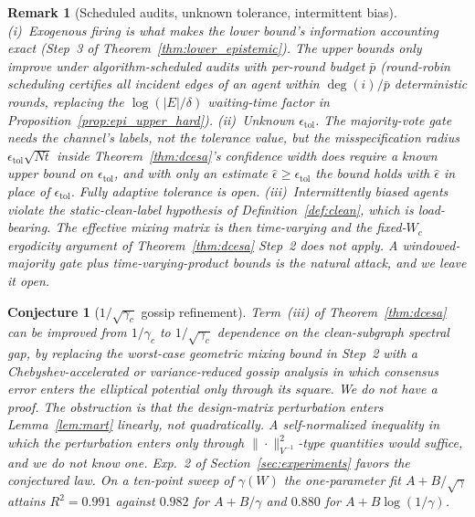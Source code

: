 \documentclass[11pt]{article}
\newtheorem{conjecture}[theorem]{Conjecture}
\newtheorem{remark}[theorem]{Remark}
\begin{document}
\begin{remark}[Scheduled audits, unknown tolerance, intermittent bias]
\label{rem:model_scope}
(i)~Exogenous firing is what makes the \emph{lower} bound's
information accounting exact (Step~3 of
Theorem~\ref{thm:lower_epistemic}). The \emph{upper} bounds only
improve under algorithm-scheduled audits with per-round budget
$\bar p$ (round-robin scheduling certifies all incident edges of an
agent within $\deg(i)/\bar p$ deterministic rounds, replacing the
$\log(|E|/\delta)$ waiting-time factor in
Proposition~\ref{prop:epi_upper_hard}).  (ii)~Unknown
$\epsilon_{\mathrm{tol}}$. The majority-vote gate needs the channel's
labels, not the tolerance value, but the \emph{misspecification
radius} $\epsilon_{\mathrm{tol}}\sqrt{Nt}$ inside
Theorem~\ref{thm:dcesa}'s confidence width does require a known upper
bound on $\epsilon_{\mathrm{tol}}$, and with only an estimate
$\hat\epsilon\geq\epsilon_{\mathrm{tol}}$ the bound holds with
$\hat\epsilon$ in place of $\epsilon_{\mathrm{tol}}$. Fully adaptive
tolerance is open.  (iii)~Intermittently biased agents violate the
static-clean-label hypothesis of Definition~\ref{def:clean}, which is
load-bearing. The effective mixing matrix is then time-varying and the
fixed-$W_c$ ergodicity argument of Theorem~\ref{thm:dcesa} Step~2 does
not apply. A windowed-majority gate plus time-varying-product bounds
\citep{koloskova2020} is the natural attack, and we leave it open.
\end{remark}

\begin{conjecture}[$1/\sqrt{\gamma_c}$ gossip refinement]
\label{conj:gossip}
Term~(iii) of Theorem~\ref{thm:dcesa} can be improved from
$1/\gamma_c$ to $1/\sqrt{\gamma_c}$ dependence on the clean-subgraph
spectral gap, by replacing the worst-case geometric mixing bound in
Step~2 with a Chebyshev-accelerated or variance-reduced gossip
analysis in which consensus error enters the elliptical potential only
through its square.  We do not have a proof. The obstruction is that
the design-matrix perturbation enters Lemma~\ref{lem:mart} linearly,
not quadratically. A self-normalized inequality in which the
perturbation enters only through $\|\cdot\|_{V^{-1}}^2$-type
quantities would suffice, and we do not know one.  Exp.~2 of
Section~\ref{sec:experiments} favors the conjectured law. On a
ten-point sweep of $\gamma(W)$ the one-parameter fit
$A+B/\sqrt{\gamma}$ attains $R^2=0.991$ against $0.982$ for
$A+B/\gamma$ and $0.880$ for $A+B\log(1/\gamma)$.
\end{conjecture}
\end{document}
